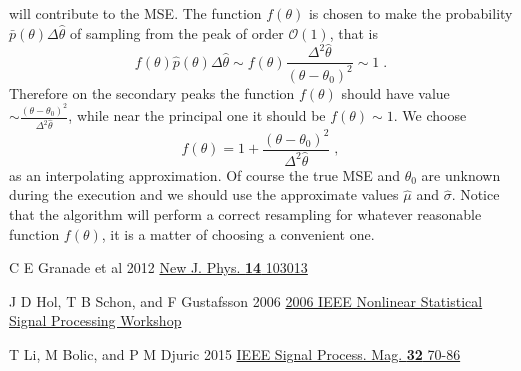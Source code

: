 \documentclass[aps, pra, 10pt, twocolumn, superscriptaddress,floatfix]{revtex4-1}
\begin{document}
%
will contribute to the MSE. The function $f(\theta)$ is chosen to make the probability $\bar{p} (\theta) \Delta \hat{\theta}$ of sampling from the peak of order $\mathcal{O}(1)$, that is
%
\begin{equation}
	f(\theta) \hat{p} (\theta) \Delta \hat{\theta} \sim f(\theta) \frac{\Delta^2 \hat{\theta}}{(\theta-\theta_0)^2} \sim 1 \; . 
\end{equation}
%
Therefore on the secondary peaks the function $f(\theta)$ should have value $\sim \frac{(\theta-\theta_0)^2}{\Delta^2 \hat{\theta}}$, while near the principal one it should be $f(\theta) \sim 1$. We choose
%
\begin{equation}
	f(\theta) = 1 + \frac{(\theta-\theta_0)^2}{\Delta^2 \hat{\theta}} \; ,
\end{equation}
%
as an interpolating approximation. Of course the true MSE and $\theta_0$ are unknown during the execution and we should use the approximate values $\hat{\mu}$ and $\hat{\sigma}$. Notice that the algorithm will perform a correct resampling for whatever reasonable function $f(\theta)$, it is a matter of choosing a convenient one. 



\begin{thebibliography}{100}
	
 C E Granade et al 2012 \href{https://doi.org/10.1088/1367-2630/14/10/103013}{New J. Phys. {\bf 14} 103013}

 J D Hol, T B Schon, and F Gustafsson 2006 \href{http://ieeexplore.ieee.org/document/4378824/}{2006 IEEE Nonlinear Statistical Signal Processing Workshop}

 T Li, M Bolic, and P M Djuric 2015 \href{https://ieeexplore.ieee.org/document/7079001/}{IEEE Signal Process. Mag. {\bf 32} 70-86}
	
\end{thebibliography}
\end{document}
